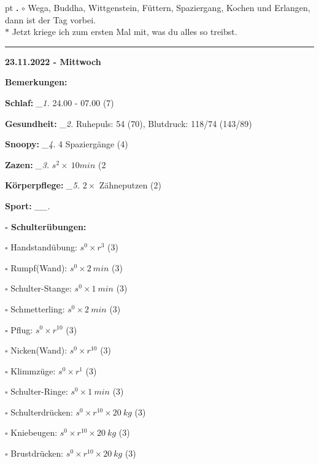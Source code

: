 \documentclass[10pt,a4paper]{article}
\newcounter{notec}
\newcommand\notep[1]{%
  \stepcounter{notec}
  \vskip #1pt
  {\bf\arabic{notec}.}
}
\newcommand\prop[1] {{\color {alizarin} {\bf #1}}}             %
\newcommand\rele[1] {{\color {english} \bf {#1}}}              %
\newcommand\mand[1] {{\color {burntorange} {\bf #1}}}          %
\newcommand\ddivide {\vskip -9pt \hrule \vskip 6pt}
\newcommand\topspace{\vskip -15pt \hskip 20pt}
\newcommand\n[1] { {\sl #1.} \hskip 5pt }
\begin{document}
\begin{mdframed}[style=daystyle]
  \notep 4 $\circ$ Wega, Buddha, Wittgenstein, Füttern, Spaziergang, Kochen und
  Erlangen, dann ist der Tag vorbei. \\
  $\ast$ Jetzt kriege ich zum ersten Mal mit, was du alles so treibst.
  
\end{mdframed}


\ddivide
{\rele {23.11.2022 - Mittwoch}}

\begin{mdframed}[style=daystyle]
  \begin{labeling}{{\mand {Bemerkungen:}}}
    \setlength\itemsep{-3pt}
  \item[{\mand {Schlaf:}}]        \n{\_1} 24.00 - 07.00 (7)
  \item[{\mand {Gesundheit:}}]    \n{\_2} Ruhepuls: 54 (70), Blutdruck: 118/74 (143/89)
  \item[{\mand {Snoopy:}}]        \n{\_4} 4 Spaziergänge (4)  
  \item[{\mand {Zazen:}}]         \n{\_3} $s^2 \times\ 10 min$ (2
  \item[{\mand {Körperpflege:}}]  \n{\_5} $2 \times$ Zähneputzen (2)
  \item[{\mand {Sport:}}]        \n{\_\_}
    \topspace
    \begin{minipage}{0.75\textwidth}  
      \begin{labeling}{\prop {$\square$ {Schulterübungen:}}} 
        \setlength\itemsep{-3pt}
      \item[$\square$ Handstandübung:]  $s^0 \times r^{3}$ (3)
      \item[$\square$ Rumpf(Wand):]     $s^0 \times 2\ min$ (3)
      \item[$\square$ Schulter-Stange:] $s^0 \times 1\ min$ (3)
      \item[$\square$ Schmetterling:]   $s^0 \times 2\ min$ (3)
      \item[$\square$ Pflug:]           $s^0 \times r^{10}$ (3)
      \item[$\square$ Nicken(Wand):]    $s^0 \times r^{10}$ (3)
      \item[$\square$ Klimmzüge:]       $s^0 \times r^1$ (3)
      \item[$\square$ Schulter-Ringe:]  $s^0 \times 1\ min$ (3)
      \item[$\square$ Schulterdrücken:] $s^0 \times r^{10} \times 20\ kg$ (3)
      \item[$\square$ Kniebeugen:]      $s^0 \times r^{10} \times 20\ kg$ (3)
      \item[$\square$ Brustdrücken:]    $s^0 \times r^{10} \times 20\ kg$ (3)

\end{labeling}
\end{minipage}
\end{labeling}
\end{mdframed}
\end{document}
